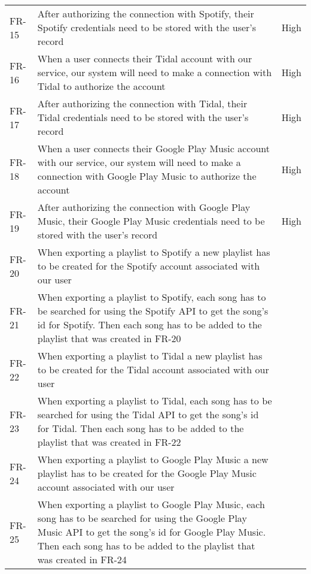 \begin{longtable}{lXl}
			FR-15 & After authorizing the connection with Spotify, their Spotify credentials need to be stored with the user's record & High \\
			FR-16 & When a user connects their Tidal account with our service, our system will need to make a connection with Tidal to authorize the account & High \\
			FR-17 & After authorizing the connection with Tidal, their Tidal credentials need to be stored with the user's record & High \\
			FR-18 & When a user connects their Google Play Music account with our service, our system will need to make a connection with Google Play Music to authorize the account & High \\
			FR-19 & After authorizing the connection with Google Play Music, their Google Play Music credentials need to be stored with the user's record & High \\
			FR-20 & When exporting a playlist to Spotify a new playlist has to be created for the Spotify account associated with our user & \\
			FR-21 & When exporting a playlist to Spotify, each song has to be searched for using the Spotify API to get the song's id for Spotify. Then each song has to be added to the playlist that was created in FR-20 & \\
			FR-22 & When exporting a playlist to Tidal a new playlist has to be created for the Tidal account associated with our user & \\
			FR-23 & When exporting a playlist to Tidal, each song has to be searched for using the Tidal API to get the song's id for Tidal. Then each song has to be added to the playlist that was created in FR-22 & \\
			FR-24 & When exporting a playlist to Google Play Music a new playlist has to be created for the Google Play Music account associated with our user & \\
			FR-25 & When exporting a playlist to Google Play Music, each song has to be searched for using the Google Play Music API to get the song's id for Google Play Music. Then each song has to be added to the playlist that was created in FR-24 & \\
\end{longtable}